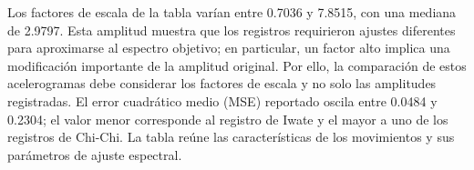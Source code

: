 \documentclass[12pt,oneside]{report}
\begin{document}
Los factores de escala de la tabla varían entre 0.7036 y 7.8515, con una
mediana de 2.9797. Esta amplitud muestra que los registros requirieron ajustes
diferentes para aproximarse al espectro objetivo; en particular, un factor
alto implica una modificación importante de la amplitud original. Por ello,
la comparación de estos acelerogramas debe considerar los factores de escala
y no solo las amplitudes registradas. El error cuadrático medio (MSE) reportado
oscila entre 0.0484 y 0.2304; el valor menor corresponde al registro de Iwate
y el mayor a uno de los registros de Chi-Chi. La tabla reúne las características
de los movimientos y sus parámetros de ajuste espectral.
\end{document}
